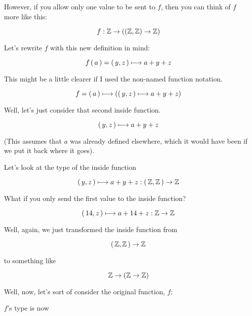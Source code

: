 However, if you allow only one value to be sent to $f$, then you can think of
$f$ more like this:

\begin{equation}
    f : \mathbb{Z} \to \left( \left( \mathbb{Z}, \mathbb{Z} \right) \to \mathbb{Z} \right)
\end{equation}

Let's rewrite $f$ with this new definition in mind:

\begin{equation}
    f \left(\, a \,\right) = \left(\, y,z \,\right) \longmapsto a + y + z
\end{equation}

This might be a little clearer if I used the non-named function notation.

\begin{equation}
    f = \left(\, a \,\right) \longmapsto \left( \left(\, y,z \,\right) \longmapsto a + y + z \right)
\end{equation}

Well, let's just consider that second inside function.

\begin{equation}
    \left(\, y,z \,\right) \longmapsto a + y + z
\end{equation}

(This assumes that $a$ was already defined elsewhere, which it would have been
if we put it back where it goes).

Let's look at the type of the inside function

\begin{equation}
    \left(\, y,z \,\right) \longmapsto a + y + z : \left(\, \mathbb{Z},\mathbb{Z} \,\right) \to \mathbb{Z}
\end{equation}

What if you only send the first value to the inside function?

\begin{equation}
    \left(\, 14,z \,\right) \longmapsto a + 14 + z : \mathbb{Z} \to \mathbb{Z}
\end{equation}

Well, again, we just transformed the inside function from

\begin{equation}
   \left(\, \mathbb{Z},\mathbb{Z} \,\right) \to \mathbb{Z}
\end{equation}

to something like

\begin{equation}
   \mathbb{Z} \to \left( \mathbb{Z} \to \mathbb{Z} \right)
\end{equation}

Well, now, let's sort of consider the original function, $f$:

$f$'s type is now

